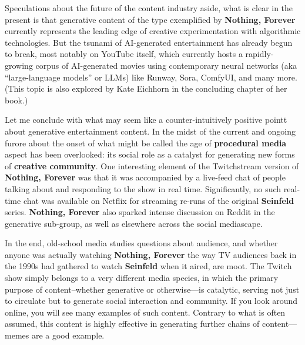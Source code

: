 \documentclass[
  letterpaper,
  DIV=11,
  numbers=noendperiod,
  oneside]{scrartcl}
\begin{document}
Speculations about the future of the content industry aside, what is
clear in the present is that generative content of the type exemplified
by \textbf{Nothing, Forever} currently represents the leading edge of
creative experimentation with algorithmic technologies. But the tsunami
of AI-generated entertainment has already begun to break, most notably
on YouTube itself, which currently hosts a rapidly-growing corpus of
AI-generated movies using contemporary neural networks (aka
``large-language models'' or LLMs) like Runway, Sora, ComfyUI, and many
more. (This topic is also explored by Kate Eichhorn in the concluding
chapter of her book.)

Let me conclude with what may seem like a counter-intuitively positive
pointt about generative entertainment content. In the midst of the
current and ongoing furore about the onset of what might be called the
age of \textbf{procedural media} aspect has been overlooked: its social
role as a catalyst for generating new forms of \textbf{creative
community}. One interesting element of the Twitchstream version of
\textbf{Nothing, Forever} was that it was accompanied by a live-feed
chat of people talking about and responding to the show in real time.
Significantly, no such real-time chat was available on Netflix for
streaming re-runs of the original \textbf{Seinfeld} series.
\textbf{Nothing, Forever} also sparked intense discussion on Reddit in
the generative sub-group, as well as elsewhere across the social
mediascape.

In the end, old-school media studies questions about audience, and
whether anyone was actually watching \textbf{Nothing, Forever} the way
TV audiences back in the 1990s had gathered to watch \textbf{Seinfeld}
when it aired, are moot. The Twitch show simply belongs to a very
different media species, in which the primary purpose of
content--whether generative or otherwise---is catalytic, serving not
just to circulate but to generate social interaction and community. If
you look around online, you will see many examples of such content.
Contrary to what is often assumed, this content is highly effective in
generating further chains of content---memes are a good example.
\end{document}
